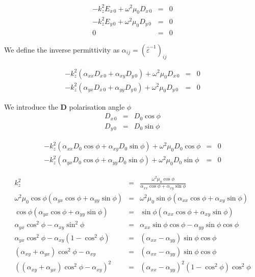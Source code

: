\documentclass[12pt,a4paper,twoside,openright,BCOR10mm,headsepline,titlepage,abstracton,chapterprefix,final]{scrreprt}
\newcommand\Vector[1]{{\mathbf{#1}}}
\newcommand\wavenumber{k}
\newcommand\Tensor[1]{\hat{#1}}
\newcommand\scalarDfield{D}
\newcommand\Dfield{\Vector{\scalarDfield}}
\newcommand\permittivity{\Tensor{\scalarpermittivity}}
\newcommand\scalarpermittivity{\varepsilon}
\begin{document}
\begin{eqnarray}
 - \wavenumber_z^2 E_{x\,0} + \omega^2 \mu_0 \scalarDfield_{x\,0} &=& 0\\ 
 - \wavenumber_z^2 E_{y\,0} + \omega^2 \mu_0 \scalarDfield_{y\,0} &=& 0\\
 0 &=& 0
\end{eqnarray}

We define the inverse permittivity as $\alpha_{ij} = (\permittivity^{-1})_{ij}$

\begin{eqnarray}
 - \wavenumber_z^2 (\alpha_{xx} \scalarDfield_{x\,0} + \alpha_{xy} \scalarDfield_{y\,0}) + \omega^2 \mu_0 \scalarDfield_{x\,0} &=& 0\\ 
 - \wavenumber_z^2 (\alpha_{yx} \scalarDfield_{x\,0} + \alpha_{yy} \scalarDfield_{y\,0}) + \omega^2 \mu_0 \scalarDfield_{y\,0} &=& 0
\end{eqnarray}

We introduce the $\Dfield$ polarisation angle $\phi$
\begin{eqnarray}
 \scalarDfield_{x\,0} &=& \scalarDfield_{0} \cos \phi \\
 \scalarDfield_{y\,0} &=& \scalarDfield_{0} \sin \phi
\end{eqnarray}

\begin{eqnarray}
 - \wavenumber_z^2 (\alpha_{xx} \scalarDfield_{0} \cos \phi + \alpha_{xy} \scalarDfield_{0} \sin \phi) + \omega^2 \mu_0 \scalarDfield_{0} \cos \phi &=& 0\\ 
 - \wavenumber_z^2 (\alpha_{yx} \scalarDfield_{0} \cos \phi + \alpha_{yy} \scalarDfield_{0} \sin \phi) + \omega^2 \mu_0 \scalarDfield_{0} \sin \phi &=& 0
\end{eqnarray}

\begin{eqnarray}
 \wavenumber_z^2 &=& \frac{ \omega^2 \mu_0 \cos \phi}{\alpha_{xx} \cos \phi + \alpha_{xy} \sin \phi}\\ 
 \omega^2 \mu_0 \cos \phi (\alpha_{yx} \cos \phi + \alpha_{yy} \sin \phi) &=& \omega^2 \mu_0 \sin \phi (\alpha_{xx} \cos \phi + \alpha_{xy} \sin \phi) \\
 \cos \phi (\alpha_{yx} \cos \phi + \alpha_{yy} \sin \phi) &=& \sin \phi (\alpha_{xx} \cos \phi + \alpha_{xy} \sin \phi) \\
 \alpha_{yx} \cos^2 \phi - \alpha_{xy} \sin^2 \phi &=& \alpha_{xx} \sin \phi \cos \phi - \alpha_{yy} \sin \phi \cos \phi \\
 \alpha_{yx} \cos^2 \phi - \alpha_{xy} ( 1- \cos^2 \phi ) &=& ( \alpha_{xx} - \alpha_{yy} ) \sin \phi \cos \phi \\
 ( \alpha_{xy} + \alpha_{yx} ) \cos^2 \phi - \alpha_{xy} &=& ( \alpha_{xx} - \alpha_{yy} ) \sin \phi \cos \phi \\
 \left( ( \alpha_{xy} + \alpha_{yx} ) \cos^2 \phi - \alpha_{xy}\right)^2 &=& ( \alpha_{xx} - \alpha_{yy} )^2 (1- \cos^2 \phi) \cos^2 \phi
\end{eqnarray}
\end{document}
